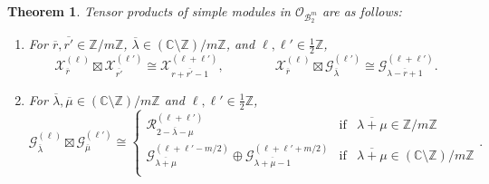 \documentclass[11pt, reqno]{amsart}
\newtheorem{thm}{Theorem}[section]
\theoremstyle{definition}\newtheorem{defi}[thm]{Definition}
\theoremstyle{definition}\newtheorem{rem}[thm]{Remark}
\theoremstyle{definition}\newtheorem{exam}[thm]{Example}
\theoremstyle{definition}\newtheorem{assum}[thm]{Assumption}
\newcommand{\cB}{\mathcal{B}}
\newcommand{\cR}{\mathcal{R}}
\newcommand{\cX}{\mathcal{X}}
\newcommand{\cO}{\mathcal{O}}
\newcommand{\cG}{\mathcal{G}}
\newcommand{\CC}{\mathbb{C}}
\newcommand{\ZZ}{\mathbb{Z}}
\newcommand{\tens}{\boxtimes}
\begin{document}
\begin{thm}\label{thm:B2m_tens_prods}
Tensor products of simple modules in $\cO_{\cB_2^{m}}$ are as follows:
\begin{enumerate}

\item  For $\overline{r},\overline{r'}\in\ZZ/m\ZZ$, $\overline{\lambda}\in(\CC\setminus\ZZ)/m\ZZ$, and $\ell,\ell'\in\frac{1}{2}\ZZ$,
\begin{equation*}
\cX_{\overline{r}}^{(\ell)}\tens \cX_{\overline{r'}}^{(\ell')}\cong \cX_{\overline{r+r'-1}}^{(\ell+\ell')},\qquad\qquad\cX_{\overline{r}}^{(\ell)}\tens \cG_{\overline{\lambda}}^{(\ell')}\cong\cG_{\overline{\lambda-r+1}}^{(\ell+\ell')}.
\end{equation*}
 
 




\item For $\overline{\lambda},\overline{\mu}\in(\CC\setminus\ZZ)/m\ZZ$ and $\ell,\ell'\in\frac{1}{2}\ZZ$,
 \begin{equation*}
 \cG_{\overline{\lambda}}^{(\ell)}\tens\cG_{\overline{\mu}}^{(\ell')}\cong\left\lbrace\begin{array}{lll}
 \cR_{\overline{2-\lambda-\mu}}^{(\ell+\ell')} & \text{if} & \overline{\lambda+\mu}\in\ZZ/m\ZZ\\
\cG^{(\ell+\ell'-m/2)}_{\overline{\lambda+\mu}}\oplus\cG^{(\ell+\ell'+m/2)}_{\overline{\lambda+\mu-1}} & \text{if} & \overline{\lambda+\mu}\in(\CC\setminus\ZZ)/m\ZZ \\
 \end{array}\right. .
% 
% 
 \end{equation*}
\end{enumerate}
\end{thm}
\end{document}
